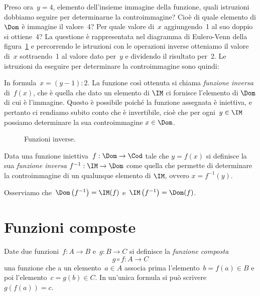 Preso ora~$y=4$, elemento dell'insieme immagine della
funzione, quali istruzioni dobbiamo seguire per determinarne la
controimmagine? Cioè di quale elemento di $\Dom$ è immagine il valore~4?
Per quale valore di~$x$ aggiungendo~1 al suo doppio si
ottiene~4?
La questione è rappresentata nel diagramma di Eulero-Venn della figura~\ref{fig:D.3} e
percorrendo le istruzioni con le operazioni inverse otteniamo il valore di~$x$
sottraendo~1 al valore dato per~$y$ e dividendo il risultato per~2. Le
istruzioni da eseguire per determinare la controimmagine sono quindi:
\begin{center}
 
\end{center}
In formula~$x=(y-1):2$.
La funzione così ottenuta si chiama \emph{funzione inversa} di~$f(x)$, che è quella che dato un elemento di $\IM$ ci fornisce l'elemento di $\Dom$ di cui è l'immagine.
Questo è possibile poiché la funzione assegnata è iniettiva, e pertanto ci rendiamo subito conto che è invertibile, cioè che per ogni~$y\in\IM$ possiamo determinare la sua controimmagine $x\in\Dom$.

\begin{figure}[b]
\centering
\caption{Funzioni inverse.}\label{fig:D.3}
\end{figure}

\begin{definizione}\label{def:funzione_inversa}
Data una funzione iniettiva~$f:\Dom \rightarrow \Cod$ tale che $y = f(x)$ si definisce la sua \emph{funzione inversa} $f^{-1}:\IM \rightarrow \Dom$ come quella che permette di determinare la
controimmagine di un qualunque elemento di $\IM$, ovvero $x = f^{-1}(y)$.
\end{definizione}

Osserviamo che~$\Dom\left(f^{-1}\right)=\IM(f)$ e~$\IM\left(f^{-1}\right)=\Dom(f)$.

 \vspazio\ovalbox{\risolvii \ref{ese:D.12}, \ref{ese:D.13}}
\section{Funzioni composte}

\begin{definizione}
Date due funzioni~$f:A\rightarrow B$ e~$g:B\rightarrow C$ si
definisce la \emph{funzione composta}
\[g\circ f:A\rightarrow C\]
una funzione che a un elemento~$a \in A$ associa prima l'elemento~$b=f(a)\in B$ e
poi l'elemento~$c=g(b) \in C$. In un'unica
formula si può scrivere~$g(f(a))=c$.
\end{definizione}


